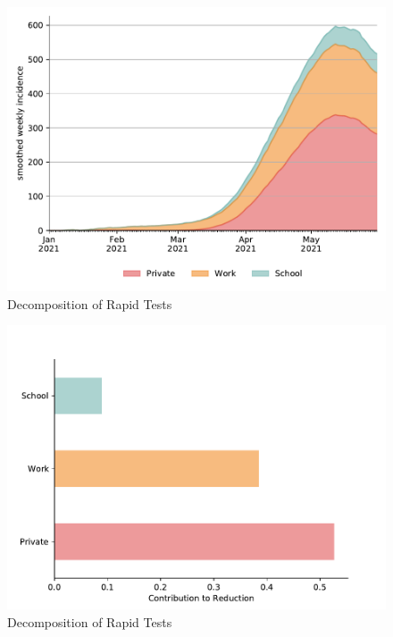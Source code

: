 \begin{figure}
\centering
        \includegraphics[width=\textwidth]{../figures/results/figures/full_decomposition_rapid_tests_area}
        \caption{Decomposition of Rapid Tests}
\end{figure}
\begin{figure}
\centering
        \includegraphics[width=\textwidth]{../figures/results/figures/full_decomposition_rapid_tests_bar}
        \caption{Decomposition of Rapid Tests}
\end{figure}


